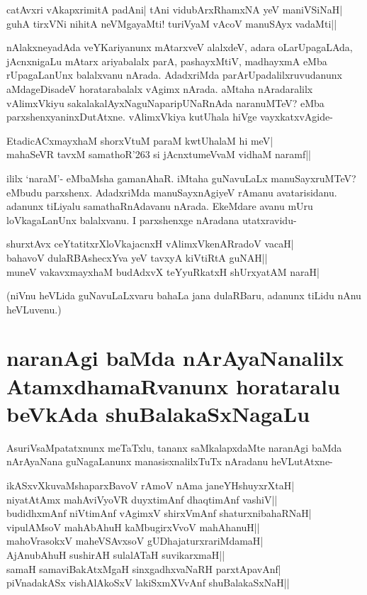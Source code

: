 \begin{shloka} 
catAvxri vAkapxrimitA padAni| tAni vidubArxRhamxNA yeV maniVSiNaH|\label{153b}\\ 
guhA tirxVNi nihitA neVMgayaMti! turiVyaM vAcoV manuSAyx  vadaMti||
\end{shloka} 

nAlakxneyadAda veYKariyanunx mAtarxveV alalxdeV, adara oLarUpagaLAda, jAcnxnigaLu mAtarx ariyabalalx parA, pashayxMtiV, madhayxmA eMba rUpagaLanUnx balalxvanu nArada. AdadxriMda parArUpadalilxruvudanunx aMdageDisadeV horatarabalalx vAgimx nArada. aMtaha nAradaralilx vAlimxVkiyu sakalakalAyxNaguNaparipUNaRnAda naranuMTeV? eMba parxshenxyaninxDutAtxne. vAlimxVkiya kutUhala hiVge vayxkatxvAgide- 

\begin{shloka} 
EtadicACxmayxhaM shorxVtuM paraM kwtUhalaM hi meV|\label{153a}\\ 
mahaSeVR tavxM samathoR\char'263 si jAcnxtumeVvaM vidhaM naramf||
\end{shloka} 

ililx `naraM'- eMbaMsha gamanAhaR. iMtaha guNavuLaLx manuSayxruMTeV? eMbudu parxshenx. AdadxriMda manuSayxnAgiyeV rAmanu avatarisidanu. adanunx tiLiyalu samathaRnAdavanu nArada. EkeMdare avanu mUru loVkagaLanUnx balalxvanu. I parxshenxge nAradana utatxravidu- 

\begin{shloka} 
shurxtAvx ceYtatitxrXloVkajacnxH vAlimxVkenARradoV vacaH|\label{153c}\\ 
bahavoV dulaRBAshecxYva yeV tavxyA kiVtiRtA guNAH||\\ 
muneV vakavxmayxhaM budAdxvX teYyuRkatxH shUrxyatAM naraH|
\end{shloka} 

(niVnu heVLida guNavuLaLxvaru bahaLa jana dulaRBaru, adanunx tiLidu nAnu heVLuvenu.) 

\section*{naranAgi baMda nArAyaNanalilx AtamxdhamaRvanunx horataralu beVkAda shuBalakaSxNagaLu} 

AsuriVsaMpatatxnunx meTaTxlu, tananx saMkalapxdaMte naranAgi baMda nArAyaNana guNagaLanunx manasisxnalilxTuTx nAradanu heVLutAtxne- 

\begin{shloka} 
ikASxvXkuvaMshaparxBavoV rAmoV nAma janeYHshuyxrXtaH|\label{154}\\ 
niyatAtAmx mahAviVyoVR duyxtimAnf dhaqtimAnf vashiV||\\ 
budidhxmAnf niVtimAnf vAgimxV shirxVmAnf shaturxnibahaRNaH|\\ 
vipulAMsoV mahAbAhuH kaMbugirxVvoV mahAhanuH||\\ 
mahoVrasokxV maheVSAvxsoV gUDhajaturxrariMdamaH|\\ 
AjAnubAhuH sushirAH sulalATaH suvikarxmaH||\\ 
samaH samaviBakAtxMgaH sinxgadhxvaNaRH parxtApavAnf|\\ 
piVnadakASx vishAlAkoSxV lakiSxmXVvAnf shuBalakaSxNaH||
\end{shloka} 

